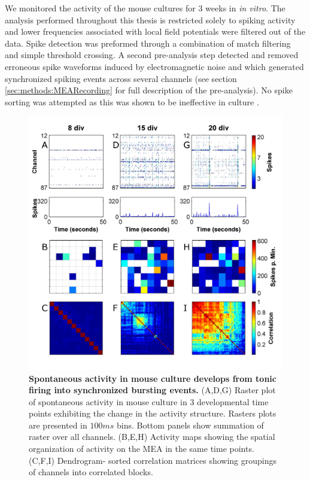 



    We monitored the activity of the mouse cultures for 3 weeks in \textit{in vitro}. The analysis performed throughout this thesis is restricted solely to spiking activity and lower frequencies associated with local field potentials were filtered out of the data. Spike detection was preformed through a combination of match filtering and simple threshold crossing. A second pre-analysis step detected and removed erroneous spike waveforms induced by electromagnetic noise and which generated synchronized spiking events across several channels (see section \ref{sec:methods:MEARecording} for full description of the pre-analysis). No spike sorting was attempted as this was shown to be ineffective in culture \cite{herzog2011optical}.

        \begin{figure}[!htb]
            \centering
            \includegraphics[width=15cm]{chapter3/figures/devExample/devActivity.jpg}

            \caption[Development of synchrony in the spontaneous activity of a representative mouse culture]{\textbf{Spontaneous activity in mouse culture develops from tonic firing into synchronized bursting events.} (A,D,G) Raster plot of spontaneous activity in mouse culture in 3 developmental time points exhibiting the change in the activity structure. Rasters plots are presented in \(100 ms\) bins. Bottom panels show summation of raster over all channels. (B,E,H) Activity maps showing the spatial organization of activity on the MEA in the same time points. (C,F,I) Dendrogram- sorted correlation matrices showing groupings of channels into correlated blocks.}
            \label{fig:activity:devExample}
        \end{figure}



